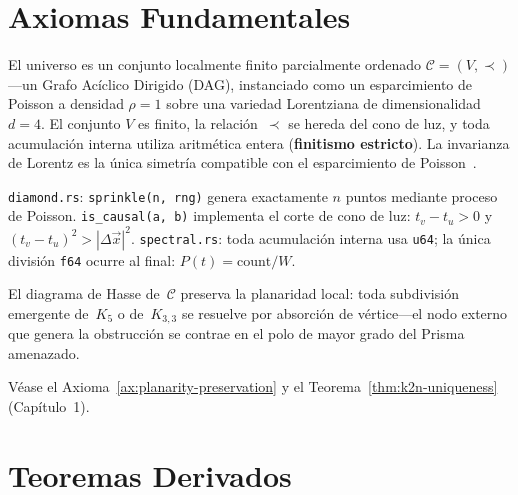 \documentclass[11pt, a4paper, openany]{book}
\begin{document}
\section{Axiomas Fundamentales}

\begin{axiom}
\label{ax:causal-finitude}
El universo es un conjunto localmente finito
parcialmente ordenado $\mathcal{C} = (V, \prec)$---un Grafo
Ac\'iclico Dirigido (DAG), instanciado como un esparcimiento de
Poisson a densidad $\rho = 1$ sobre una variedad Lorentziana de
dimensionalidad $d = 4$. El conjunto $V$ es finito, la
relaci\'on~$\prec$ se hereda del cono de luz, y toda
acumulaci\'on interna utiliza aritm\'etica entera
(\textbf{finitismo estricto}). La invarianza de Lorentz es la
\'unica simetr\'ia compatible con el esparcimiento de
Poisson~\cite{bombelli2009}.

\medskip\noindent
\texttt{diamond.rs}: \texttt{sprinkle(n, rng)} genera exactamente
$n$ puntos mediante proceso de Poisson. \texttt{is\_causal(a, b)}
implementa el corte de cono de luz: $t_v - t_u > 0$ y
$(t_v - t_u)^2 > |\Delta\vec{x}|^2$.
\texttt{spectral.rs}: toda acumulaci\'on interna usa
\texttt{u64}; la \'unica divisi\'on \texttt{f64} ocurre al
final: $P(t) = \text{count} / W$.
\end{axiom}

\begin{axiom}
\label{ax:planarity-preservation-app}
El diagrama de Hasse de~$\mathcal{C}$ preserva la planaridad
local: toda subdivisi\'on emergente de~$K_5$ o de~$K_{3,3}$ se
resuelve por absorci\'on de v\'ertice---el nodo externo que
genera la obstrucci\'on se contrae en el polo de mayor grado del
Prisma amenazado.

\medskip\noindent
V\'ease el Axioma~\ref{ax:planarity-preservation} y el
Teorema~\ref{thm:k2n-uniqueness} (Cap\'itulo~1).
\end{axiom}

\section{Teoremas Derivados}
\label{sec:derived-theorems}
\end{document}
